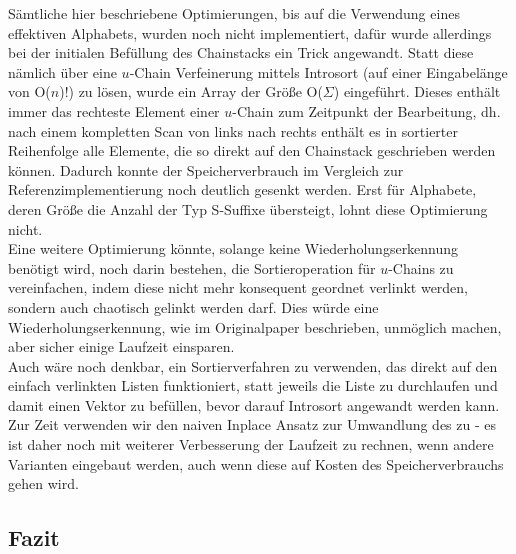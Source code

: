 Sämtliche hier beschriebene Optimierungen, bis auf die Verwendung eines effektiven Alphabets, wurden noch nicht implementiert, dafür wurde allerdings bei der initialen Befüllung des Chainstacks ein Trick angewandt. 
Statt diese nämlich über eine $u$-Chain Verfeinerung mittels Introsort (auf einer Eingabelänge von O($n$)!) zu lösen, wurde ein Array der Größe O($\Sigma$) eingeführt. Dieses enthält immer das rechteste Element einer $u$-Chain zum Zeitpunkt der Bearbeitung, dh. nach einem kompletten Scan von links nach rechts enthält es in sortierter Reihenfolge alle Elemente, die so direkt auf den Chainstack geschrieben werden können.
Dadurch konnte der Speicherverbrauch im Vergleich zur Referenzimplementierung noch deutlich gesenkt werden. Erst für Alphabete, deren Größe die Anzahl der Typ S-Suffixe übersteigt, lohnt diese Optimierung nicht.\\

Eine weitere Optimierung könnte, solange keine Wiederholungserkennung benötigt wird, noch darin bestehen, die Sortieroperation für $u$-Chains zu vereinfachen, indem diese nicht mehr konsequent geordnet verlinkt werden, sondern auch chaotisch gelinkt werden darf. Dies würde eine Wiederholungserkennung, wie im Originalpaper beschrieben, unmöglich machen, aber sicher einige Laufzeit einsparen.\\

Auch wäre noch denkbar, ein Sortierverfahren zu verwenden, das direkt auf den einfach verlinkten Listen funktioniert, statt jeweils die Liste zu durchlaufen und damit einen Vektor zu befüllen, bevor darauf Introsort angewandt werden kann.\\

Zur Zeit verwenden wir den naiven Inplace Ansatz zur Umwandlung des \isa zu \sa - es ist daher noch mit weiterer Verbesserung der Laufzeit zu rechnen, wenn andere Varianten eingebaut werden, auch wenn diese auf Kosten des Speicherverbrauchs gehen wird.


\subsection{Fazit}


